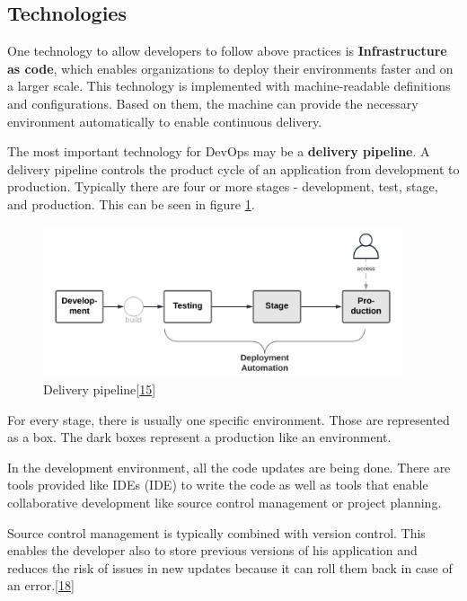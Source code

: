 \documentclass[12pt,english,a4paper,oneside,,tablecaptionabove]{scrbook}
\begin{document}
\hypertarget{technologies}{%
\subsection{Technologies}\label{technologies}}

One technology to allow developers to follow above practices is
\textbf{Infrastructure as code}, which enables organizations to deploy
their environments faster and on a larger scale. This technology is
implemented with machine-readable definitions and configurations. Based
on them, the machine can provide the necessary environment automatically
to enable continuous delivery.

The most important technology for DevOps may be a \textbf{delivery
pipeline}. A delivery pipeline controls the product cycle of an
application from development to production. Typically there are four or
more stages - development, test, stage, and production. This can be seen
in figure \ref{fig:del_pipeline}.

\begin{figure}
\hypertarget{fig:del_pipeline}{%
\centering
\includegraphics[width=4.16667in,height=\textheight]{images/chapter2/delivery_pipeline.png}
\caption{Delivery
pipeline{[}\protect\hyperlink{ref-Sharma2017}{15}{]}}\label{fig:del_pipeline}
}
\end{figure}

For every stage, there is usually one specific environment. Those are
represented as a box. The dark boxes represent a production like an
environment.

In the development environment, all the code updates are being done.
There are tools provided like \acs{IDE}s (\acl{IDE}) to write the code
as well as tools that enable collaborative development like source
control management or project planning.

Source control management is typically combined with version control.
This enables the developer also to store previous versions of his
application and reduces the risk of issues in new updates because it can
roll them back in case of an
error.{[}\protect\hyperlink{ref-TaliSoroker}{18}{]}
\end{document}
